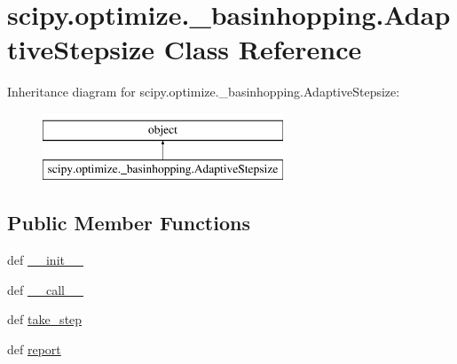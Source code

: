 \hypertarget{classscipy_1_1optimize_1_1__basinhopping_1_1AdaptiveStepsize}{}\section{scipy.\+optimize.\+\_\+basinhopping.\+Adaptive\+Stepsize Class Reference}
\label{classscipy_1_1optimize_1_1__basinhopping_1_1AdaptiveStepsize}
Inheritance diagram for scipy.\+optimize.\+\_\+basinhopping.\+Adaptive\+Stepsize\+:\begin{figure}[H]
\begin{center}
\leavevmode
\includegraphics[height=2.000000cm]{classscipy_1_1optimize_1_1__basinhopping_1_1AdaptiveStepsize}
\end{center}
\end{figure}
\subsection*{Public Member Functions}
\begin{DoxyCompactItemize}
\item 
def \hyperlink{classscipy_1_1optimize_1_1__basinhopping_1_1AdaptiveStepsize_a9be00adcb6fa88cbbdd167078734f88b}{\+\_\+\+\_\+init\+\_\+\+\_\+}
\item 
def \hyperlink{classscipy_1_1optimize_1_1__basinhopping_1_1AdaptiveStepsize_a14b1a0b8d8ab47b28db47c73ca83857d}{\+\_\+\+\_\+call\+\_\+\+\_\+}
\item 
def \hyperlink{classscipy_1_1optimize_1_1__basinhopping_1_1AdaptiveStepsize_aeb097667e9932330e0fc3ad3553b6221}{take\+\_\+step}
\item 
def \hyperlink{classscipy_1_1optimize_1_1__basinhopping_1_1AdaptiveStepsize_a724fb0b81534257c5e3556939a9f8a5f}{report}
\end{DoxyCompactItemize}
